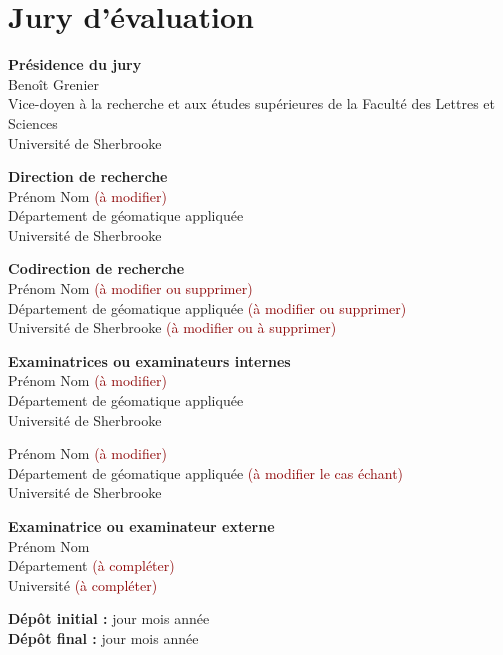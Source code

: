 \chapter*{Jury d’évaluation}
\thispagestyle{empty}

\textbf{Présidence du jury} \\ 
Benoît Grenier \\
Vice-doyen à la recherche et aux études supérieures de la Faculté des Lettres et Sciences \\
Université de Sherbrooke
\vspace{0.5cm}

\textbf{Direction de recherche} \\ 
Prénom Nom \textcolor{darkred}{(à modifier)} \\
Département de géomatique appliquée \\
Université de Sherbrooke 
\vspace{0.5cm}

\textbf{Codirection de recherche} \\ 
Prénom Nom \textcolor{darkred}{(à modifier ou supprimer)} \\
Département de géomatique appliquée \textcolor{darkred}{(à modifier ou supprimer)} \\
Université de Sherbrooke \textcolor{darkred}{(à modifier ou à supprimer)}
\vspace{0.5cm}

\textbf{Examinatrices ou examinateurs internes} \\
Prénom Nom \textcolor{darkred}{(à modifier)} \\
Département de géomatique appliquée \\
Université de Sherbrooke
\vspace{0.5cm}

Prénom Nom \textcolor{darkred}{(à modifier)} \\
Département de géomatique appliquée \textcolor{darkred}{(à modifier le cas échant)}\\
Université de Sherbrooke
\vspace{0.5cm}

\textbf{Examinatrice ou examinateur externe} \\ 
Prénom Nom \\
Département \textcolor{darkred}{(à compléter)} \\
Université \textcolor{darkred}{(à compléter)}
\vspace{.5cm}

\vfill

\begin{center}
\textbf{Dépôt initial :} jour mois année \\
\textbf{Dépôt final :} jour mois année
\end{center}

\newpage
